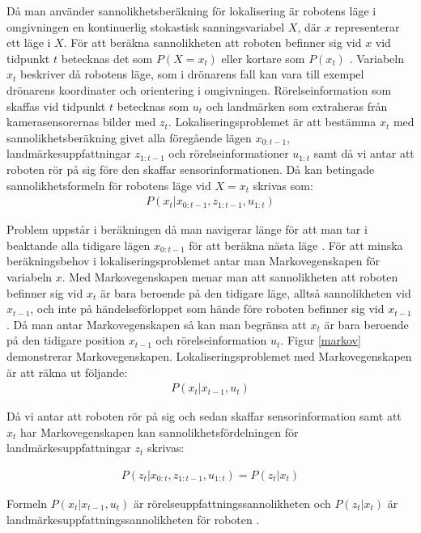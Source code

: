 Då man använder sannolikhetsberäkning för lokalisering är robotens läge i omgivningen en kontinuerlig stokastisk sanningsvariabel $X$, där $x$ representerar ett läge i $X$. För att beräkna sannolikheten att roboten befinner sig vid $x$ vid tidpunkt $t$ betecknas det som $P(X = x_t)$ eller kortare som $P(x_t)$ \citep{ProbabilisticRobotics}. Variabeln $x_t$ beskriver då robotens läge, som i drönarens fall kan vara till exempel drönarens koordinater och orientering i omgivningen. Rörelseinformation som skaffas vid tidpunkt $t$ betecknas som $u_t$ och landmärken som extraheras från kamerasensorernas bilder med $z_t$. Lokaliseringsproblemet är att bestämma $x_t$ med sannolikhetsberäkning givet alla föregående lägen $x_{0:t-1}$, landmärkesuppfattningar $z_{1:t-1}$ och rörelseinformationer $u_{1:t}$ samt då vi antar att roboten rör på sig före den skaffar sensorinformationen. Då kan betingade sannolikhetsformeln för robotens läge vid $X = x_t$ skrivas som:
\begin{align}
    P( x_t | x_{0:t-1}, z_{1:t-1}, u_{1:t})
\end{align}

Problem uppstår i beräkningen då man navigerar länge för att man tar i beaktande alla tidigare lägen $x_{0:t-1}$ för att beräkna nästa läge \citep{ProbabilisticRobotics}. För att minska beräkningsbehov i lokaliseringsproblemet antar man Markovegenskapen för variabeln $x$. Med Markovegenskapen menar man att sannolikheten att roboten befinner sig vid $x_t$ är bara beroende på den tidigare läge, alltså sannolikheten vid $x_{t-1}$, och inte på händelseförloppet som hände före roboten befinner sig vid $x_{t-1}$. Då man antar Markovegenskapen så kan man begränsa att $x_t$ är bara beroende på den tidigare position $x_{t-1}$ och rörelseinformation $u_t$. Figur \ref{markov} demonstrerar Markovegenskapen. Lokaliseringsproblemet med Markovegenskapen är att räkna ut följande:
\begin{align}
    P( x_t | x_{t-1}, u_{t})
\end{align}

Då vi antar att roboten rör på sig och sedan skaffar sensorinformation samt att $x_t$ har Markovegenskapen kan sannolikhetsfördelningen för landmärkesuppfattningar $z_t$ skrivas:

\begin{align}
    P(z_t | x_{0:t}, z_{1:t-1}, u_{1:t}) = P(z_t|x_t)
\end{align}

Formeln $P(x_t|x_{t-1}, u_{t})$ är rörelseuppfattningssannolikheten och $P(z_t|x_t)$ är landmärkesuppfattningssannolikheten för roboten \citep{ProbabilisticRobotics}. 

